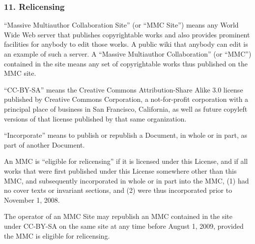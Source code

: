 \documentclass[a4paper,openany]{book}
\begin{document}
\begin{results}
\subsubsection*{11. Relicensing}

``Massive Multiauthor Collaboration Site'' (or ``MMC Site'') means any
World Wide Web server that publishes copyrightable works and also
provides prominent facilities for anybody to edit those works. A
public wiki that anybody can edit is an example of such a server. A
``Massive Multiauthor Collaboration'' (or ``MMC'') contained in the
site means any set of copyrightable works thus published on the MMC
site.

``CC-BY-SA'' means the Creative Commons Attribution-Share Alike 3.0
license published by Creative Commons Corporation, a not-for-profit
corporation with a principal place of business in San Francisco,
California, as well as future copyleft versions of that license
published by that same organization.

``Incorporate'' means to publish or republish a Document, in whole or
in part, as part of another Document.

An MMC is ``eligible for relicensing'' if it is licensed under this
License, and if all works that were first published under this License
somewhere other than this MMC, and subsequently incorporated in whole
or in part into the MMC, (1) had no cover texts or invariant sections,
and (2) were thus incorporated prior to November 1, 2008.

The operator of an MMC Site may republish an MMC contained in the site
under CC-BY-SA on the same site at any time before August 1, 2009,
provided the MMC is eligible for relicensing.

\end{results}
\end{document}
